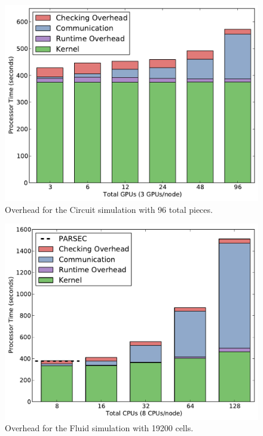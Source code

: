 \begin{figure}
\begin{center}
\includegraphics[scale=0.40]{figs/circuit_96_popl.pdf}
\end{center}
\caption{Overhead for the Circuit simulation with 96 total pieces.\label{fig:ckt_overhead}}
\end{figure}

\begin{figure}
\begin{center}
\includegraphics[scale=0.40]{figs/fluid_19200_popl.pdf}
\end{center}
\caption{Overhead for the Fluid simulation with 19200 cells.\label{fig:fluid_overhead}}
\end{figure}

